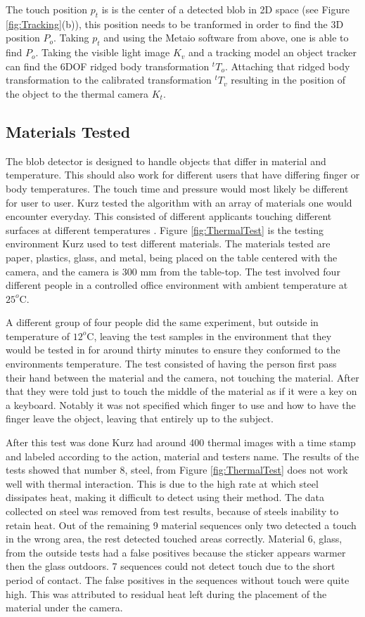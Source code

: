 \documentclass{sig-alternate}
\begin{document}
The touch position \(p_t\) is is the center of a detected blob in 2D space (see Figure \ref{fig:Tracking}(b)), this position needs to be tranformed in order to find the 3D position \(P_o\). 
Taking \(p_t\) and using the Metaio software from above, one is able to find \(P_o\). Taking the visible light image \(K_v\) and a tracking model an object tracker can find the 6DOF ridged body transformation \({^t}T_o\). Attaching that ridged body transformation to the calibrated transformation \({^t}T_v\) resulting in the position of the object to the thermal camera \(K_t\).

\subsection{Materials Tested}
\label{Materials Tested}
The blob detector is designed to handle objects that differ in material and temperature. This should also work for different users that have differing finger or body temperatures. The touch time and pressure would most likely be different for user to user. Kurz tested the algorithm with an array of materials one would encounter everyday. This consisted of different applicants touching different surfaces at different temperatures \cite{3D}. Figure \ref{fig:ThermalTest} is the testing environment Kurz used to test different materials. The materials tested are paper, plastics, glass, and metal, being placed on the table centered with the camera, and the camera is 300 mm from the table-top. The test involved four different people in a controlled office environment with ambient temperature at \(25^o\)C. 

A different group of four people did the same experiment, but outside in temperature of \(12^o\)C, leaving the test samples in the environment that they would be tested in for around thirty minutes to ensure they conformed to the environments temperature. The test consisted of having the person first pass their hand between the material and the camera, not touching the material. After that they were told just to touch the middle of the material as if it were a key on a keyboard. Notably it was not specified which finger to use and how to have the finger leave the object, leaving that entirely up to the subject. 

After this test was done Kurz had around 400 thermal images with a time stamp and labeled according to the action, material and testers name. The results of the tests showed that number 8, steel, from Figure \ref{fig:ThermalTest} does not work well with thermal interaction. This is due to the high rate at which steel dissipates heat, making it difficult to detect using their method. The data collected on steel was removed from test results, because of steels inability to retain heat. Out of the remaining 9 material sequences only two detected a touch in the wrong area, the rest detected touched areas correctly. Material 6, glass, from the outside tests had a false positives because the sticker appears warmer then the glass outdoors. 7 sequences could not detect touch due to the short period of contact. The false positives in the sequences without touch were quite high. This was attributed to residual heat left during the placement of the material under the camera.
\end{document}

